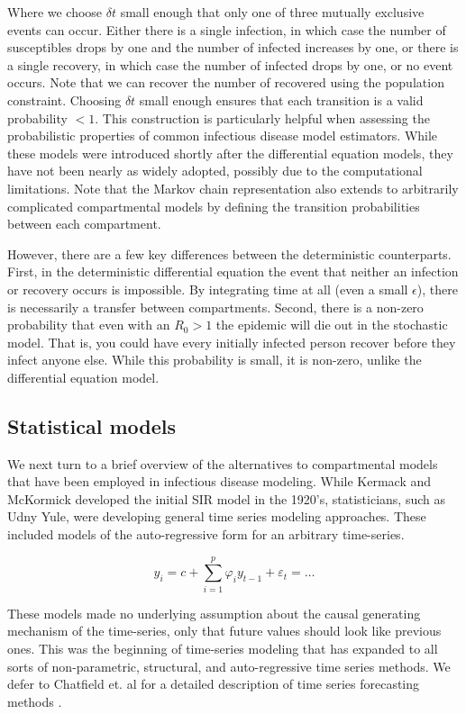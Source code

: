 \documentclass{umassthesis}          %
\begin{document}
Where we choose $\delta t$ small enough that only one of three mutually exclusive events can occur. Either there is a single infection, in which case the number of susceptibles drops by one and the number of infected increases by one, or there is a single recovery, in which case the number of infected drops by one, or no event occurs. Note that we can recover the number of recovered using the population constraint. Choosing $\delta t$ small enough ensures that each transition is a valid probability $<1$. This construction is particularly helpful when assessing the probabilistic properties of common infectious disease model estimators. While these models were introduced shortly after the differential equation models, they have not been nearly as widely adopted, possibly due to the computational limitations. Note that the Markov chain representation also extends to arbitrarily complicated compartmental models by defining the transition probabilities between each compartment. 

However, there are a few key differences between the deterministic counterparts. First, in the deterministic differential equation the event that neither an infection or recovery occurs is impossible. By integrating time at all (even a small $\epsilon$), there is necessarily a transfer between compartments. Second, there is a non-zero probability that even with an $R_0 > 1$ the epidemic will die out in the stochastic model. That is, you could have every initially infected person recover before they infect anyone else. While this probability is small, it is non-zero, unlike the differential equation model. 


\subsection{Statistical models}


We next turn to a brief overview of the alternatives to compartmental models that have been employed in infectious disease modeling. While Kermack and McKormick developed the initial SIR model in the 1920's, statisticians, such as Udny Yule, were developing general time series modeling approaches. These included models of the auto-regressive form for an arbitrary time-series. 

\begin{equation}\label{eq:AR}
y_i = c + \sum_{i=1}^{p}\varphi_i y_{t-1} + \varepsilon_t = \dots
    \end{equation}

These models made no underlying assumption about the causal generating mechanism of the time-series, only that future values should look like previous ones. This was the beginning of time-series modeling that has expanded to all sorts of non-parametric, structural, and auto-regressive time series methods. We defer to Chatfield et. al for a detailed description of time series forecasting methods \cite{chatfield2000time}.
\end{document}
